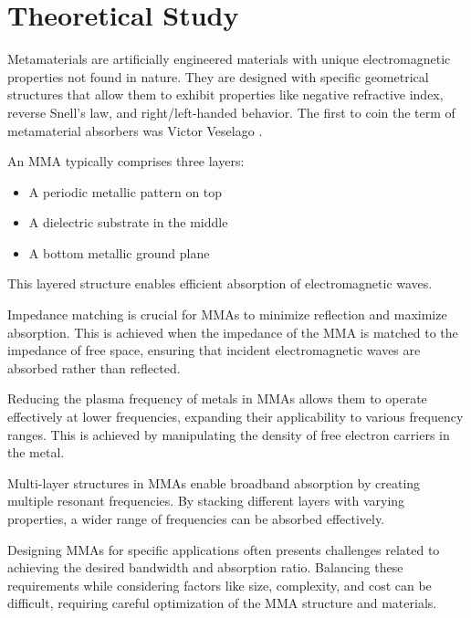 \section{\textsf{Theoretical Study}}
    Metamaterials are artificially engineered materials with unique electromagnetic properties
    not found in nature. They are designed with specific geometrical structures that allow them
    to exhibit properties like negative refractive index, reverse Snell's law, and right/left-handed
    behavior. The first to coin the term of metamaterial absorbers was Victor Veselago \cite{veselago_left_2006}.
    
    An MMA typically comprises three layers: 
    \begin{itemize}
        \item A periodic metallic pattern on top
        \item A dielectric substrate in the middle
        \item A bottom metallic ground plane
    \end{itemize}
    This layered structure enables efficient absorption of electromagnetic waves.

    Impedance matching is crucial for MMAs to minimize reflection and maximize absorption. 
    This is achieved when the impedance of the MMA is matched to the impedance of free space,
    ensuring that incident electromagnetic waves are absorbed rather than reflected.
    
    Reducing the plasma frequency of metals in MMAs allows them to operate effectively at 
    lower frequencies, expanding their applicability to various frequency ranges. 
    This is achieved by manipulating the density of free electron carriers in the metal.

    Multi-layer structures in MMAs enable broadband absorption by creating multiple resonant
    frequencies. By stacking different layers with varying properties, a wider range of 
    frequencies can be absorbed effectively.

    Designing MMAs for specific applications often presents challenges related to achieving 
    the desired bandwidth and absorption ratio. Balancing these requirements while considering
    factors like size, complexity, and cost can be difficult, requiring careful optimization
    of the MMA structure and materials.